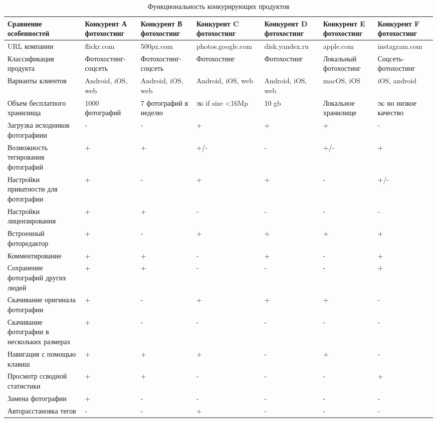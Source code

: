 \begin{landscape}
\begin{table}[H]
  \caption{Функциональность конкурирующих продуктов}\label{comp-table}
  \smalltable
  \begin{tabular}{|p{5.8cm}|p{2.8cm}|p{2.8cm}|p{2.8cm}|p{2.8cm}|p{2.8cm}|p{2.8cm}|} %
  \hline Сравнение особенностей & Конкурент А фотохостинг & Конкурент В фотохостинг & Конкурент C фотохостинг & Конкурент D фотохостинг & Конкурент E фотохостинг & Конкурент F фотохостинг \\ 
  \hline URL компании & flickr.com & 500px.com & photos.google.com & disk.yandex.ru & apple.com & instagram.com \\ 
  \hline Классификация продукта & Фотохостинг-соцсеть & Фотохостинг-соцсеть & Фотохостинг & Фотохостинг & Локальный фотохостинг & Соцсеть-фотохостинг \\ 
  \hline Варианты клиентов & Android, iOS, web & Android, iOS, web & Android, iOS, web & Android, iOS, web & macOS, iOS & iOS, android \\ 
  \hline Объем бесплатного хранилища & 1000 фотографий & 7 фотографий в неделю & ∞ if size <16Mp & 10 gb & Локальное хранилище & ∞ но низкое качество \\ 
  \hline Загрузка исходников фотографиии & - & - & + & + & + & - \\ 
  \hline Возможность тегирования фотографий & + & + & +/- & - & +/- & + \\ 
  \hline Настройки приватности для фотографии & + & - & + & + & - & +/- \\ 
  \hline Настройки лицензирования & + & + & - & - & - & - \\ 
  \hline Встроенный фоторедактор & + & - & + & + & + & + \\ 
  \hline Комментирование & + & + & - & + & - & + \\ 
  \hline Сохранение фотографий других людей & + & + & - & - & - & + \\ 
  \hline Скачивание оригинала фотографии & + & - & + & + & + & - \\ 
  \hline Скачивание фотографии в нескольких размерах & + & - & - & - & - & - \\ 
  \hline Навигация с помощью клавиш & + & + & + & - & + & - \\ 
  \hline Просмотр ссводной статистики & + & + & - & - & - & + \\ 
  \hline Замена фотографии & + & - & - & - & - & - \\ 
  \hline Авторасстановка тегов & - & - & + & - & - & - \\ 

\end{tabular}
\end{table}
\end{landscape}
